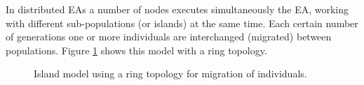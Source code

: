 \documentclass[final,1p,times]{elsarticle}
\begin{document}
In distributed EAs a number of nodes executes simultaneously the EA, working with different sub-populations (or islands) at the same time. Each certain number of generations one or more individuals are interchanged (migrated) between populations. Figure \ref{fig:islands} shows this model with a ring topology.  %






\begin{figure}[htb]
\centering
{}
\caption{Island model using a ring topology for migration of individuals.}
\label{fig:islands}
\end{figure}
\end{document}
